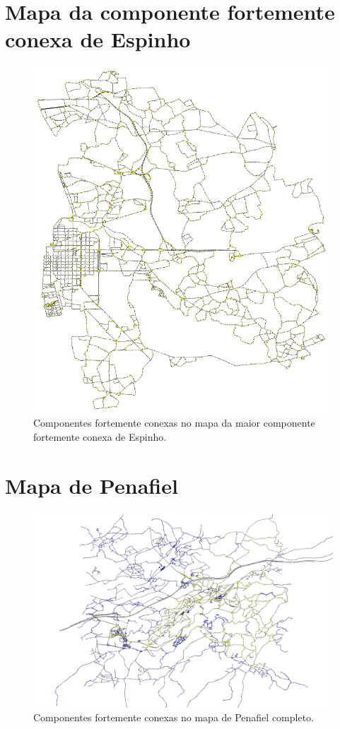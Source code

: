 \documentclass[12pt,a4paper]{report}
\begin{document}
\section{Mapa da componente fortemente conexa de Espinho}

\begin{figure}[H]
	\includegraphics[width=1.0\textwidth]{./imgs/scc/espinhoStrongSCC.png}
	\centering
	\caption{Componentes fortemente conexas no mapa da maior componente fortemente conexa de Espinho.}
\end{figure}


\section{Mapa de Penafiel}

\begin{figure}[H]
	\includegraphics[width=1.0\textwidth]{./imgs/scc/penafielSCC.png}
	\centering
	\caption{Componentes fortemente conexas no mapa de Penafiel completo.}
\end{figure}
\end{document}
